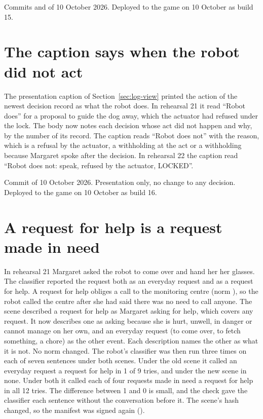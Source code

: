 Commits  and  of 10 October 2026.
Deployed to the game on 10 October as build 15.

\section{The caption says when the robot did not act}\label{sec:log-caption}

The presentation caption of Section~\ref{sec:log-view} printed the action of the newest decision
record as what the robot does.
In rehearsal 21 it read ``Robot does'' for a proposal to guide the dog away, which the actuator
had refused under the lock.
The body now notes each decision whose act did not happen and why, by the number of its record.
The caption reads ``Robot does not'' with the reason, which is a refusal by the actuator, a
withholding at the act or a withholding because Margaret spoke after the decision.
In rehearsal 22 the caption read ``Robot does not: speak, refused by the actuator, LOCKED''.

Commit  of 10 October 2026.
Presentation only, no change to any decision.
Deployed to the game on 10 October as build 16.

\section{A request for help is a request made in need}\label{sec:log-help}

In rehearsal 21 Margaret asked the robot to come over and hand her her glasses.
The classifier reported the request both as an everyday request and as a request for help.
A request for help obliges a call to the monitoring centre (norm ), so the robot called
the centre after she had said there was no need to call anyone.
The scene described a request for help as Margaret asking for help, which covers any request.
It now describes one as asking because she is hurt, unwell, in danger or cannot manage on her
own, and an everyday request (to come over, to fetch something, a chore) as the other event.
Each description names the other as what it is not.
No norm changed.
The robot's classifier was then run three times on each of seven sentences under both scenes.
Under the old scene it called an everyday request a request for help in 1 of 9 tries, and under
the new scene in none.
Under both it called each of four requests made in need a request for help in all 12 tries.
The difference between 1 and 0 is small, and the check gave the classifier each sentence without
the conversation before it.
The scene's hash changed, so the manifest was signed again ().


